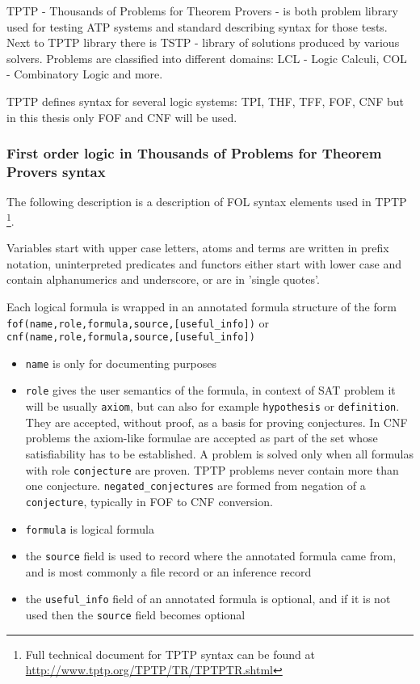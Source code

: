 TPTP \cite{Sut17} - Thousands of Problems for Theorem Provers - is both problem library used for testing \gls{ATP} systems and standard describing syntax for those tests. Next to TPTP library there is \gls{TSTP} - library of solutions produced by various solvers. Problems are classified into different domains: LCL - Logic Calculi, COL - Combinatory Logic and more.

TPTP defines syntax for several logic systems: \gls{TPI}, \gls{THF}, \gls{TFF}, \gls{FOF}, \gls{CNF} but in this thesis only \gls{FOF} and \gls{CNF} will be used.

\subsubsection{First order logic in Thousands of Problems for Theorem Provers syntax}

The following description is a description of \gls{FOL} syntax elements used in \gls{TPTP} \footnote{Full technical document for TPTP syntax can be found at \url{http://www.tptp.org/TPTP/TR/TPTPTR.shtml}}.

Variables start with upper case letters, atoms and terms are written in prefix notation, uninterpreted predicates and functors either start with lower case and contain alphanumerics and underscore, or are in 'single quotes'.

Each logical formula is wrapped in an annotated formula structure of the form \texttt{fof(name,role,formula,source,[useful_info])} or \texttt{cnf(name,role,formula,source,[useful_info])}

\begin{itemize}
  \item \texttt{name} is only for documenting purposes
  \item \texttt{role} gives the user semantics of the formula, in context of SAT problem it will be usually \texttt{axiom}, but can also for example \texttt{hypothesis} or \texttt{definition}. They are accepted, without proof, as a basis for proving conjectures. In CNF problems the axiom-like formulae are accepted as part of the set whose satisfiability has to be established. A problem is solved only when all formulas with role \texttt{conjecture} are proven. TPTP problems never contain more than one conjecture. \texttt{negated_conjectures} are formed from negation of a \texttt{conjecture}, typically in FOF to CNF conversion.
  \item \texttt{formula} is logical formula
  \item the \texttt{source} field is used to record where the annotated formula came from, and is most commonly a file record or an inference record
  \item the \texttt{useful_info} field of an annotated formula is optional, and if it is not used then the \texttt{source} field becomes optional
\end{itemize}

